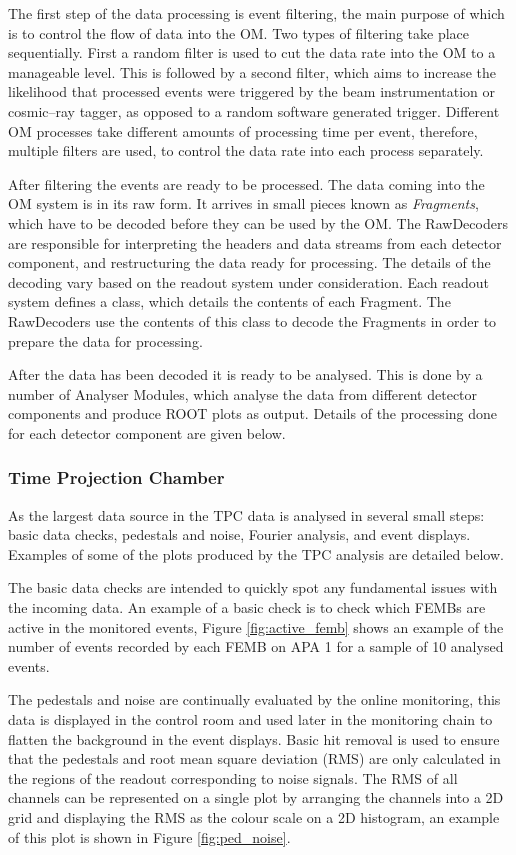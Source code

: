 The first step of the data processing is event filtering, the main purpose of
which is to control the flow of data into the OM. Two types of filtering
take place sequentially. First a random filter is used to cut the data rate 
into the OM to a manageable level. This is followed by a second filter, which 
aims to increase the likelihood that processed events were triggered by the 
beam instrumentation or cosmic--ray tagger, as opposed to a random software 
generated trigger. Different OM processes take different amounts of processing 
time per event, therefore, multiple filters are used, to control the data rate 
into each process separately.

After filtering the events are ready to be processed. The data coming into the
OM system is in its raw form. It arrives in small pieces known as
\emph{Fragments}, which have to be decoded before they can be used by the OM. 
The RawDecoders are responsible for interpreting the headers and data streams 
from each detector component, and restructuring the data ready for processing. 
The details of the decoding vary based on the readout system under 
consideration.  Each readout system defines a class, which details the 
contents of each Fragment. The RawDecoders use the contents of this class to 
decode the Fragments in order to prepare the data for 
processing.

After the data has been decoded it is ready to be analysed. This is done by a
number of Analyser Modules, which analyse the data from different detector
components and produce ROOT\cite{ANTCHEVA20092499} plots as output. Details 
of the processing done for each detector component are given below.

\subsubsection*{Time Projection Chamber}
As the largest data source in \protodune{} the TPC data is analysed in several
small steps: basic data checks, pedestals and noise, Fourier analysis, and event
displays. Examples of some of the plots produced by the TPC analysis are
detailed below.

The basic data checks are intended to quickly spot any fundamental issues with
the incoming data. An example of a basic check is to check which FEMBs are
active in the monitored events, Figure \ref{fig:active_femb} shows an example of
the number of events recorded by each FEMB on APA 1 for a sample of 10 analysed
events.

The pedestals and noise are continually evaluated by the online monitoring, this
data is displayed in the control room and used later in the monitoring chain to
flatten the background in the event displays. Basic hit removal is used to 
ensure that the pedestals and root mean square deviation (RMS) are only 
calculated in the regions of the readout corresponding to noise signals. The 
RMS of all channels can be represented on a single plot by arranging the 
channels into a 2D grid and displaying the RMS as the colour scale on a 2D 
histogram, an example of this plot is shown in Figure \ref{fig:ped_noise}.

